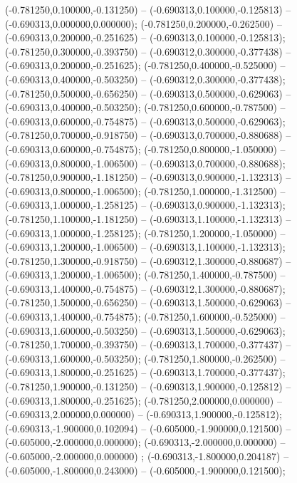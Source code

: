  (-0.781250,0.100000,-0.131250) -- (-0.690313,0.100000,-0.125813) -- (-0.690313,0.000000,0.000000);
 (-0.781250,0.200000,-0.262500) -- (-0.690313,0.200000,-0.251625) -- (-0.690313,0.100000,-0.125813);
 (-0.781250,0.300000,-0.393750) -- (-0.690312,0.300000,-0.377438) -- (-0.690313,0.200000,-0.251625);
 (-0.781250,0.400000,-0.525000) -- (-0.690313,0.400000,-0.503250) -- (-0.690312,0.300000,-0.377438);
 (-0.781250,0.500000,-0.656250) -- (-0.690313,0.500000,-0.629063) -- (-0.690313,0.400000,-0.503250);
 (-0.781250,0.600000,-0.787500) -- (-0.690313,0.600000,-0.754875) -- (-0.690313,0.500000,-0.629063);
 (-0.781250,0.700000,-0.918750) -- (-0.690313,0.700000,-0.880688) -- (-0.690313,0.600000,-0.754875);
 (-0.781250,0.800000,-1.050000) -- (-0.690313,0.800000,-1.006500) -- (-0.690313,0.700000,-0.880688);
 (-0.781250,0.900000,-1.181250) -- (-0.690313,0.900000,-1.132313) -- (-0.690313,0.800000,-1.006500);
 (-0.781250,1.000000,-1.312500) -- (-0.690313,1.000000,-1.258125) -- (-0.690313,0.900000,-1.132313);
 (-0.781250,1.100000,-1.181250) -- (-0.690313,1.100000,-1.132313) -- (-0.690313,1.000000,-1.258125);
 (-0.781250,1.200000,-1.050000) -- (-0.690313,1.200000,-1.006500) -- (-0.690313,1.100000,-1.132313);
 (-0.781250,1.300000,-0.918750) -- (-0.690312,1.300000,-0.880687) -- (-0.690313,1.200000,-1.006500);
 (-0.781250,1.400000,-0.787500) -- (-0.690313,1.400000,-0.754875) -- (-0.690312,1.300000,-0.880687);
 (-0.781250,1.500000,-0.656250) -- (-0.690313,1.500000,-0.629063) -- (-0.690313,1.400000,-0.754875);
 (-0.781250,1.600000,-0.525000) -- (-0.690313,1.600000,-0.503250) -- (-0.690313,1.500000,-0.629063);
 (-0.781250,1.700000,-0.393750) -- (-0.690313,1.700000,-0.377437) -- (-0.690313,1.600000,-0.503250);
 (-0.781250,1.800000,-0.262500) -- (-0.690313,1.800000,-0.251625) -- (-0.690313,1.700000,-0.377437);
 (-0.781250,1.900000,-0.131250) -- (-0.690313,1.900000,-0.125812) -- (-0.690313,1.800000,-0.251625);
 (-0.781250,2.000000,0.000000) -- (-0.690313,2.000000,0.000000) -- (-0.690313,1.900000,-0.125812);
 (-0.690313,-1.900000,0.102094) -- (-0.605000,-1.900000,0.121500) -- (-0.605000,-2.000000,0.000000);
 (-0.690313,-2.000000,0.000000) -- (-0.605000,-2.000000,0.000000) ;
 (-0.690313,-1.800000,0.204187) -- (-0.605000,-1.800000,0.243000) -- (-0.605000,-1.900000,0.121500);
